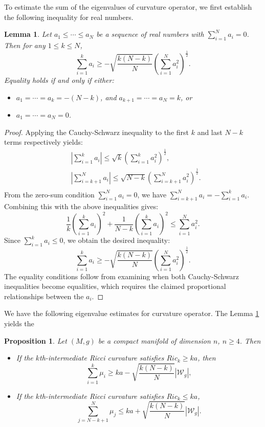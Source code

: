 \documentclass[12pt, twoside]{article}
\newtheorem{lemma}[theorem]{Lemma}
\newtheorem{proposition}[theorem]{Proposition}
\theoremstyle{definition}
\numberwithin{equation}{section}
\begin{document}
To estimate the sum of the eigenvalues of curvature operator, we first establish the following inequality for real numbers.
\begin{lemma}\label{L4}
	Let $a_{1} \leq \cdots \leq a_{N}$ be a sequence of real numbers with $\sum_{i=1}^{N} a_{i} = 0$. Then for any $1 \leq k \leq N$, 
	$$\sum_{i=1}^{k}a_{i}\geq-\sqrt{\frac{k(N-k)}{N}}(\sum_{i=1}^{N}a^{2}_{i})^{\frac{1}{2}}.$$
	Equality holds if and only if either:
	\begin{itemize}
		\item[(1)] $a_{1} = \cdots = a_{k} = -(N-k)$, and $a_{k+1} = \cdots = a_{N} = k$, or
		\item [(2)]$a_{1} = \cdots = a_{N} = 0$.
	\end{itemize}
\end{lemma}
\begin{proof}
	Applying the Cauchy-Schwarz inequality to the first $k$ and last $N-k$ terms respectively yields:
	\begin{equation*}
	\begin{split}
	&|\sum_{i=1}^{k}a_{i}|\leq \sqrt{k}(\sum_{i=1}^{k}a^{2}_{i})^{\frac{1}{2}},\\
	&|\sum_{i=k+1}^{N}a_{i}|\leq \sqrt{N-k}(\sum_{i=k+1}^{N}a^{2}_{i})^{\frac{1}{2}}.\\
	\end{split}
	\end{equation*}
	From the zero-sum condition $\sum_{i=1}^{N} a_{i} = 0$, we have $\sum_{i=k+1}^{N} a_{i} = -\sum_{i=1}^{k} a_{i}$. Combining this with the above inequalities gives:
	\begin{equation*}
	\frac{1}{k}(\sum_{i=1}^{k}a_{i})^{2}+\frac{1}{N-k}(\sum_{i=1}^{k}a_{i})^{2}\leq\sum_{i=1}^{N}a^{2}_{i}.
	\end{equation*}
	Since $\sum_{i=1}^{k} a_{i} \leq 0$, we obtain the desired inequality: 
	$$\sum_{i=1}^{k}a_{i}\geq-\sqrt{\frac{k(N-k)}{N}}(\sum_{i=1}^{N}a^{2}_{i})^{\frac{1}{2}}.$$
	The equality conditions follow from examining when both Cauchy-Schwarz inequalities become equalities, which requires the claimed proportional relationships between the $a_i$.
\end{proof}
We have the following eigenvalue estimates for curvature operator. The Lemma \ref{L4} yields the
\begin{proposition}\label{P4}
Let $(M,g)$ be a compact manifold of dimension $n$, $n\geq4$. Then  
\begin{itemize}
	\item[(1)]If the $k$th-intermediate Ricci curvature satisfies $Ric_{k}\geq ka$, then 
	$$\sum_{i=1}^{k}\mu_{i}\geq ka-\sqrt{\frac{k(N-k)}{N}}|\mathcal{W}_{g}|,$$
	\item[(2)]If the $k$th-intermediate Ricci curvature satisfies $Ric_{k}\leq ka$,
	$$\sum_{j=N-k+1}^{N}\mu_{j}\leq ka+\sqrt{\frac{k(N-k)}{N}}|\mathcal{W}_{g}|.$$
\end{itemize}
\end{proposition}
\end{document}
